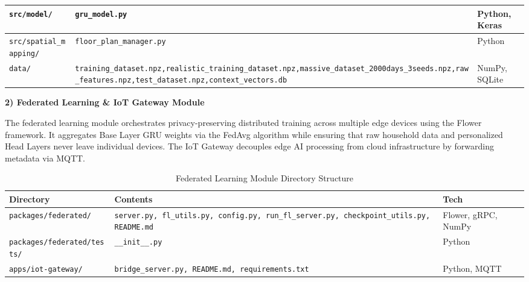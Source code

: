 \documentclass[conference]{IEEEtran}
\begin{document}
\begin{table}[H]
\begin{tabular}{|>{\raggedright\arraybackslash}p{2.6cm}|>{\raggedright\arraybackslash}p{3.5cm}|p{1.4cm}|}
\hline
\texttt{src/}\newline\texttt{model/} & \texttt{gru\_model.py} & Python, Keras \\
\hline
\texttt{src/}\newline\texttt{spatial\_mapping/} & \texttt{floor\_plan\_manager.py} & Python \\
\hline
\texttt{data/} & \texttt{training\_dataset.npz,}\newline\texttt{realistic\_training\_}\newline\texttt{dataset.npz,}\newline\texttt{massive\_dataset\_}\newline\texttt{2000days\_3seeds.npz,}\newline\texttt{raw\_features.npz,}\newline\texttt{test\_dataset.npz,}\newline\texttt{context\_vectors.db} & NumPy, SQLite \\
\hline
\end{tabular}
\end{table}

\textbf{2) Federated Learning \& IoT Gateway Module}

The federated learning module orchestrates privacy-preserving distributed training across multiple edge devices using the Flower framework. It aggregates Base Layer GRU weights via the FedAvg algorithm while ensuring that raw household data and personalized Head Layers never leave individual devices. The IoT Gateway decouples edge AI processing from cloud infrastructure by forwarding metadata via MQTT.

\begin{table}[H]
\caption{Federated Learning Module Directory Structure}
\def\arraystretch{1.2}
\footnotesize
\begin{tabular}{|>{\raggedright\arraybackslash}p{2.6cm}|>{\raggedright\arraybackslash}p{3.5cm}|p{1.4cm}|}
\hline
\textbf{Directory} & \textbf{Contents} & \textbf{Tech} \\
\hline
\texttt{packages/}\newline\texttt{federated/} & \texttt{server.py, fl\_utils.py, config.py, run\_fl\_server.py, checkpoint\_utils.py, README.md} & Flower, gRPC, NumPy \\
\hline
\texttt{packages/}\newline\texttt{federated/tests/} & \texttt{\_\_init\_\_.py} & Python \\
\hline
\texttt{apps/}\newline\texttt{iot-gateway/} & \texttt{bridge\_server.py, README.md, requirements.txt} & Python, MQTT \\
\hline
\end{tabular}
\end{table}
\end{document}
